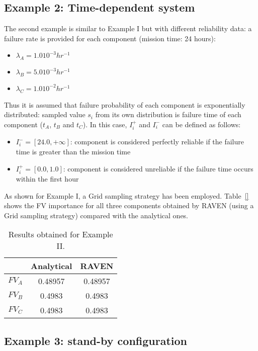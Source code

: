 \subsection{Example 2: Time-dependent system}
\label{sec:example2}

The second example is similar to Example I but with different reliability data: 
a failure rate is provided for each component (mission time: 24 hours): 
\begin{itemize}
  \item $\lambda_A = 1.0 10^{-3} hr^{-1}$
  \item $\lambda_B = 5.0 10^{-3} hr^{-1}$
  \item $\lambda_C = 1.0 10^{-2} hr^{-1}$
\end{itemize}
Thus it is assumed that failure probability of each component is exponentially 
distributed: sampled value $s_i$ from its own distribution is failure time of each 
component ($t_A$, $t_B$ and $t_C$).
In this case, $I_i^+$ and $I_i^-$ can be defined as follows:
\begin{itemize}
  \item $I_i^-=[24.0,+\infty]$: component is considered perfectly reliable if the failure 
        time is greater than the mission time
  \item $I_i^+=[0.0,1.0]$: component is considered unreliable if the failure time 
        occurs within the first hour
\end{itemize}

As shown for Example I, a Grid sampling strategy has been employed. Table~\ref{} shows the 
FV importance for all three components obtained by RAVEN (using a Grid sampling strategy) 
compared with the analytical ones.

\begin{table}
  \caption{Results obtained for Example II.} 
  \centering 
  \begin{tabular}{c | c | c } 
    \hline 
     & Analytical & RAVEN \\ 
    \hline 
    $FV_A$ & 0.48957 & 0.48957  \\
    $FV_B$ & 0.4983  & 0.4983   \\
    $FV_C$ & 0.4983  & 0.4983   \\
    \hline 
  \end{tabular}
  \label{tab:example2} 
\end{table}

\subsection{Example 3: stand-by configuration}
\label{sec:example3}

